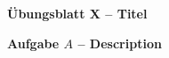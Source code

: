 \documentclass[paper=a4,fontsize=11pt]{scrartcl}%
\numberwithin{equation}{section}
\begin{document}
\center
\Large{\textbf{Übungsblatt X -- Titel}}\\
\begin{center}\Large{\textbf{Aufgabe $A$ -- Description}}\end{center}\vskip0.25in
\end{document}
